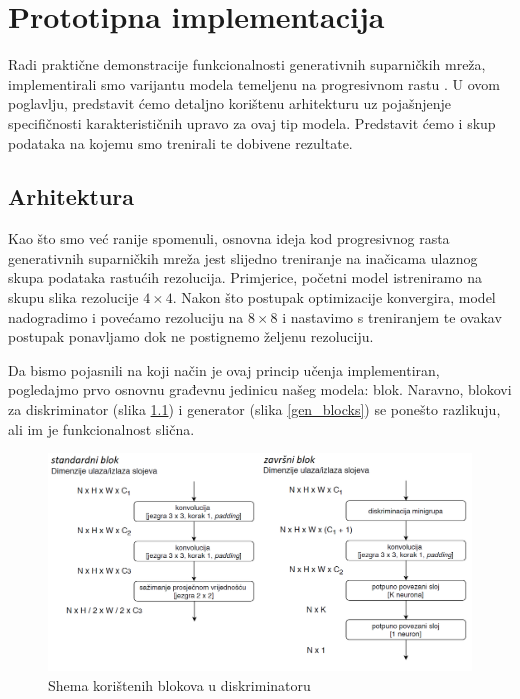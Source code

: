 \chapter{Prototipna implementacija}
Radi praktične demonstracije funkcionalnosti generativnih suparničkih mreža, implementirali smo varijantu modela temeljenu na progresivnom rastu \citep{karras2017progressive}. U ovom poglavlju, predstavit ćemo detaljno korištenu arhitekturu uz pojašnjenje specifičnosti karakterističnih upravo za ovaj tip modela. Predstavit ćemo i skup podataka na kojemu smo trenirali te dobivene rezultate.

\section{Arhitektura}
Kao što smo već ranije spomenuli, osnovna ideja kod progresivnog rasta generativnih suparničkih mreža jest slijedno treniranje na inačicama ulaznog skupa podataka rastućih rezolucija. Primjerice, početni model istreniramo na skupu slika rezolucije $4 \times 4$. Nakon što postupak optimizacije konvergira, model nadogradimo i povećamo rezoluciju na $8 \times 8$ i nastavimo s treniranjem te ovakav postupak ponavljamo dok ne postignemo željenu rezoluciju.

Da bismo pojasnili na koji način je ovaj princip učenja implementiran, pogledajmo prvo osnovnu građevnu jedinicu našeg modela: blok. Naravno, blokovi za diskriminator (slika \ref{disc_blocks}) i generator (slika \ref{gen_blocks}) se ponešto razlikuju, ali im je funkcionalnost slična. 

\begin{figure}[h]
\centering
		\includegraphics[height=0.5\textwidth]{images/blokovi_diskriminatora.png}
\caption{Shema korištenih blokova u diskriminatoru}
\label{disc_blocks}
\end{figure}

